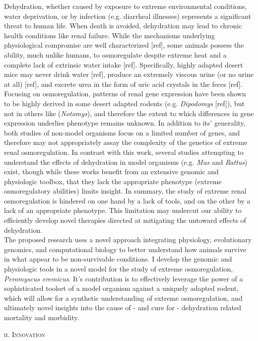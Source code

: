 \documentclass[11pt]{article}
\begin{document}
Dehydration, whether caused by exposure to extreme environmental conditions, water deprivation, or by infection (e.g. diarrheal illnesses) represents a significant threat to human life. When death is avoided, dehydration may lead to chronic health conditions like renal failure. While the mechanisms underlying physiological compromise are well characterized [ref], some animals possess the ability, much unlike humans, to osmoregulate despite extreme heat and a complete lack of extrinsic water intake [ref]. Specifically, highly adapted desert mice may never drink water [ref], produce an extremely viscous urine (or no urine at all) [ref], and excrete urea in the form of uric acid crystals in the feces [ref]. Focusing on osmoregulation, patterns of renal gene expression have been shown to be highly derived in some desert adapted rodents (e.g. \textit{Dipodomys} [ref]), but not in others like (\textit{Notomys}), and therefore the extent to which differences in gene expression underlies phenotype remains unknown. In addition to its' generality, both studies of non-model organisms focus on a limited number of genes, and therefore may not appropriately assay the complexity of the genetics of extreme renal osmoregulation. In contrast with this work, several studies attempting to understand the effects of dehydration in model organisms (e.g. \textit{Mus} and \textit{Rattus}) exist, though while these works benefit from an extensive genomic and physiologic toolbox, that they lack the appropriate phenotype (extreme osmoregulatory abilities) limits insight. In summary, the study of extreme renal osmoregulation is hindered on one hand by a lack of tools, and on the other by a lack of an appropriate phenotype. This limitation may undercut our ability to efficiently develop novel therapies directed at mitigating the untoward effects of dehydration. \\

The proposed research uses a novel approach integrating physiology, evolutionary genomics, and computational biology to better understand how animals survive in what appear to be non-survivable conditions. I develop the genomic and physiologic tools in a novel model for the study of extreme osmoregulation, \textit{Peromyscus eremicus}. It's contribution is to effectively leverage the power of a sophisticated toolset of a model organism against a uniquely adapted rodent, which will allow for a synthetic understanding of extreme osmoregulation, and ultimately novel insights into the cause of - and cure for - dehydration related mortality and morbidity.
\normalsize 
\begin{center}
\textsc{{ii. Innovation}} \\
\end{center}
\end{document}
